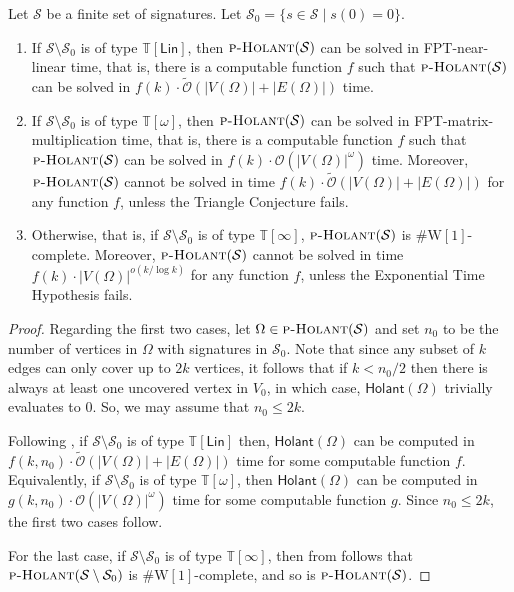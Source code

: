 \documentclass[authorcolumns,numberwithinsect]{no-lipics-v2022}
\newcommand{\holantprob}{\text{\sc{p-Holant}}}
\newcommand{\holant}{\mathsf{Holant}}
\begin{document}
\begin{theorem}\label{thm:holant_trichotomy_zero}
Let $\mathcal{S}$ be a finite set of signatures. Let $\mathcal{S}_0 = \{s \in \mathcal{S} \mid s(0) = 0\}$.
\begin{enumerate}
\item If $\mathcal{S}\setminus\mathcal{S}_0$ is of type $\mathbb{T}[\mathsf{Lin}]$, then $\holantprob(\mathcal{S})$ can be solved in FPT-near-linear time, that is, there is a computable function $f$ such that $\holantprob(\mathcal{S})$ can be solved in $f(k)\cdot\tilde{\mathcal{O}}(|V(\Omega)| + |E(\Omega)|)$ time.
\item If $\mathcal{S}\setminus\mathcal{S}_0$ is of type $\mathbb{T}[\omega]$, then $\holantprob(\mathcal{S})$ can be solved in FPT-matrix-multiplication time, that is, there is a computable function $f$ such that $\holantprob(\mathcal{S})$ can be solved in $f(k)\cdot\mathcal{O}(|V(\Omega)|^{\omega})$ time. Moreover, $\textsc{p-Holant}(\mathcal{S})$ cannot be solved in time $f(k)\cdot \tilde{\mathcal{O}}(|V(\Omega)|+|E(\Omega)|)$ for any function $f$, unless the Triangle Conjecture fails.
\item Otherwise, that is, if $\mathcal{S}\setminus\mathcal{S}_0$ is of type $\mathbb{T}[\infty]$, $\holantprob(\mathcal{S})$ is $\#\mathrm{W}[1]$-complete. Moreover, $\textsc{p-Holant}(\mathcal{S})$ cannot be solved in time $f(k)\cdot |V(\Omega)|^{o(k/\log k)}$ for any function $f$, unless the Exponential Time Hypothesis fails.
\end{enumerate}
\end{theorem}
\begin{proof}
Regarding the first two cases, let $\Omega \in \holantprob(\mathcal{S})$ and set $n_0$ to be the number of vertices in $\Omega$ with signatures in $\mathcal{S}_0$. Note that since any subset of $k$ edges can only cover up to $2k$ vertices, it follows that if $k < n_0/2$ then there is always at least one uncovered vertex in $V_0$, in which case, $\holant(\Omega)$ trivially evaluates to 0. So, we may assume that $n_0 \leq 2k$. 

Following , if $\mathcal{S}\setminus\mathcal{S}_0$ is of type $\mathbb{T}[\mathsf{Lin}]$ then, $\holant(\Omega)$ can be computed in $f(k, n_0) \cdot \tilde{\mathcal{O}}(|V(\Omega)|+|E(\Omega)|)$ time for some computable function $f$. Equivalently, if $\mathcal{S}\setminus\mathcal{S}_0$ is of type $\mathbb{T}[\omega]$, then $\holant(\Omega)$ can be computed in $g(k,n_0)\cdot\mathcal{O}(|V(\Omega)|^{\omega})$ time for some computable function $g$. Since $n_0 \leq 2k$, the first two cases follow.

For the last case, if $\mathcal{S}\setminus\mathcal{S}_0$ is of type $\mathbb{T}[\infty]$, then from  follows that $\holantprob(\mathcal{S}\setminus\mathcal{S}_0)$ is $\#\mathrm{W}[1]$-complete, and so is $\holantprob(\mathcal{S})$.
\end{proof}
\end{document}
